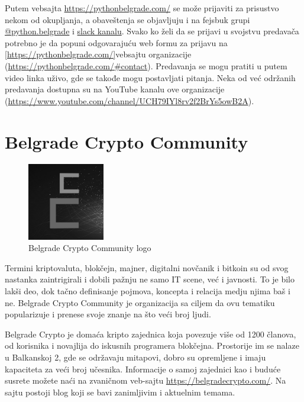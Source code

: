 \documentclass[a4paper]{article}
\begin{document}
{Putem vebsajta \url{https://pythonbelgrade.com/} se može prijaviti za prisustvo nekom od okupljanja, a obaveštenja se objavljuju i na fejsbuk grupi \href{https://www.facebook.com/python.belgrade/}{@python.belgrade} i \href{https://pythonbelgrade.slack.com/join/shared_invite/enQtNTM0OTI4NzY3NDI2LTk2OThkNjQ2YmM5NWNkNTBjMjU3NDY0NjcyNDFiYmZmNjQ4MDE3NjczYWM0NTk1YWVlYzlhNGIwYjU3NjA3Y2Y}{slack kanalu}. Svako ko želi da se prijavi u svojstvu predavača potrebno je da popuni odgovarajuću web formu za prijavu na \ref{https://pythonbelgrade.com/}{vebsajtu} organizacije (\url{https://pythonbelgrade.com/#contact}). Predavanja se mogu pratiti u putem video linka uživo, gde se takođe mogu postavljati pitanja. Neka od već održanih predavanja dostupna su na YouTube kanalu ove organizacije (\url{https://www.youtube.com/channel/UCH79IYl8rv2f2BrYs5owB2A}).

\section{Belgrade Crypto Community}
\label{sec:bgdcs}

\begin{figure}[h]
  \centering
  \includegraphics[width=0.3\textwidth]{bcc_logo.png}
  \caption{Belgrade Crypto Community logo}
\end{figure}

Termini  kriptovaluta, blokčejn, majner, digitalni novčanik i bitkoin su od svog nastanka zaintrigirali i dobili pažnju ne samo IT scene, već i javnosti. To je bilo lakši deo, dok tačno definisanje pojmova, koncepta i relacija medju njima baš i ne. Belgrade Crypto Community je organizacija sa ciljem da ovu tematiku popularizuje i prenese svoje znanje na što veći broj ljudi.

Belgrade Crypto je domaća kripto zajednica koja povezuje više od 1200 članova, od korisnika i novajlija do iskusnih programera blokčejna. Prostorije im se nalaze u Balkanskoj 2, gde se održavaju mitapovi, dobro su opremljene i imaju kapaciteta za veći broj učesnika. Informacije o samoj zajednici kao i buduće susrete možete naći na zvaničnom veb-sajtu \url{https://belgradecrypto.com/}. Na sajtu postoji blog koji se bavi zanimljivim i aktuelnim temama.

}
\end{document}
